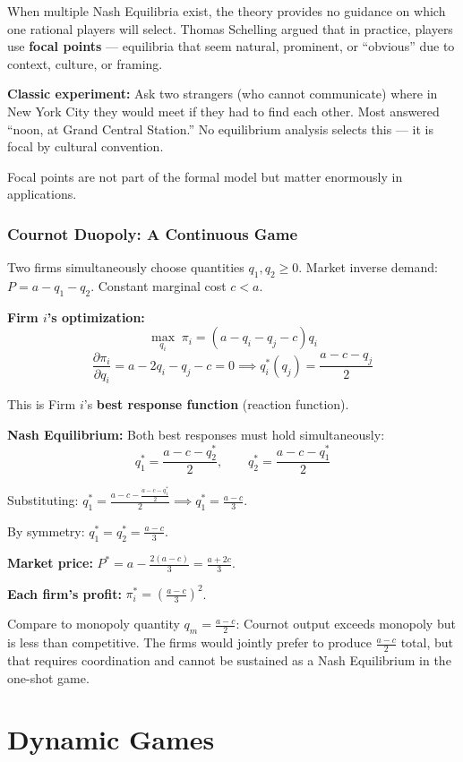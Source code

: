\documentclass[hidelinks]{article}
\begin{document}
When multiple Nash Equilibria exist, the theory provides no guidance on which one rational players will select. Thomas Schelling argued that in practice, players use \textbf{focal points} — equilibria that seem natural, prominent, or ``obvious'' due to context, culture, or framing.

\textbf{Classic experiment:} Ask two strangers (who cannot communicate) where in New York City they would meet if they had to find each other. Most answered ``noon, at Grand Central Station.'' No equilibrium analysis selects this — it is focal by cultural convention.

Focal points are not part of the formal model but matter enormously in applications.

\subsubsection{Cournot Duopoly: A Continuous Game}

Two firms simultaneously choose quantities $q_1, q_2 \geq 0$. Market inverse demand: $P = a - q_1 - q_2$. Constant marginal cost $c < a$.

\textbf{Firm $i$'s optimization:}
\[
\max_{q_i} \; \pi_i = (a - q_i - q_j - c) q_i
\]
\[
\frac{\partial \pi_i}{\partial q_i} = a - 2q_i - q_j - c = 0 \implies q_i^*(q_j) = \frac{a-c-q_j}{2}
\]

This is Firm $i$'s \textbf{best response function} (reaction function).

\textbf{Nash Equilibrium:} Both best responses must hold simultaneously:
\[
q_1^* = \frac{a-c-q_2^*}{2}, \qquad q_2^* = \frac{a-c-q_1^*}{2}
\]

Substituting: $q_1^* = \frac{a-c - \frac{a-c-q_1^*}{2}}{2} \implies q_1^* = \frac{a-c}{3}$.

By symmetry: $q_1^* = q_2^* = \frac{a-c}{3}$.

\textbf{Market price:} $P^* = a - \frac{2(a-c)}{3} = \frac{a+2c}{3}$.

\textbf{Each firm's profit:} $\pi_i^* = \left(\frac{a-c}{3}\right)^2$.

Compare to monopoly quantity $q_m = \frac{a-c}{2}$: Cournot output exceeds monopoly but is less than competitive. The firms would jointly prefer to produce $\frac{a-c}{2}$ total, but that requires coordination and cannot be sustained as a Nash Equilibrium in the one-shot game.

\newpage
\section{Dynamic Games}
\end{document}
